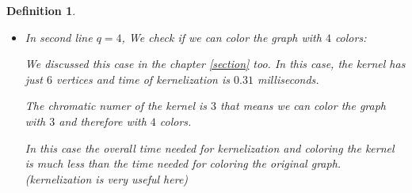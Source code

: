 \documentclass[12pt]{article}
\theoremstyle{slplain}
\newtheorem{defi}{Definition}
\begin{document}
\begin{defi}
\begin{itemize}
As we saw in the chapter \ref{section} in this case, the kernel has $11$ vertices, the same as the original graph. Time for this kernelization is $0.39$ milliseconds. 

After kernelization, we run the exact algorithm for coloring the kernel. In this case chromatic number is again $4$ and the coloring time is $2.62$ milliseconds. 

\item In second line $q = 4$, We check if we can color the graph with $4$ colors:

We discussed this case in the chapter \ref{section} too. In this case, the kernel has just $6$ vertices and time of kernelization is $0.31$ milliseconds.

The chromatic numer of the kernel is $3$ that means we can color the graph with $3$ and therefore with $4$ colors. 

In this case the overall time needed for kernelization and coloring the kernel is much less than the time needed for coloring the original graph. (kernelization is very useful here)
\end{itemize}


\end{defi}
\end{document}
